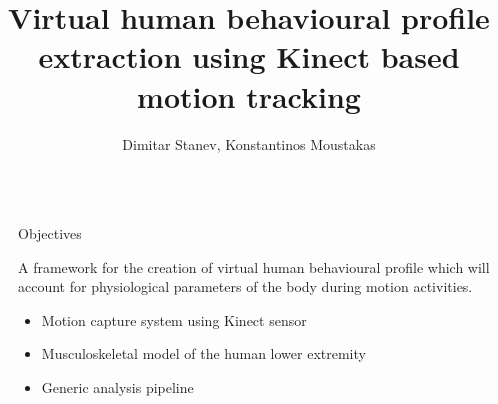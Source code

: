 \documentclass[final]{beamer}
\title{\huge{Virtual human behavioural profile extraction using Kinect based motion tracking}} %
\author{Dimitar Stanev, Konstantinos Moustakas} %
\institute{University of Patras, Electrical and Computer Engineering Department} %
\newlength{\sepwid}
\newlength{\onecolwid}
\begin{document}

\setlength{\belowcaptionskip}{2ex} %
\setlength\belowdisplayshortskip{2ex} %

\begin{frame}[t] %

\begin{columns}[t] %

\begin{column}{\sepwid}\end{column} %


\begin{column}{\onecolwid}\vspace{-0.5in} %


\begin{alertblock}{Objectives}

A framework for the creation of virtual human behavioural profile which will account for physiological parameters of the body during motion activities.

\begin{itemize}
	\item Motion capture system using Kinect sensor
	\item Musculoskeletal model of the human lower extremity
	\item Generic analysis pipeline
\end{itemize}

\end{alertblock}



\end{column}
\end{columns}
\end{frame}
\end{document}
